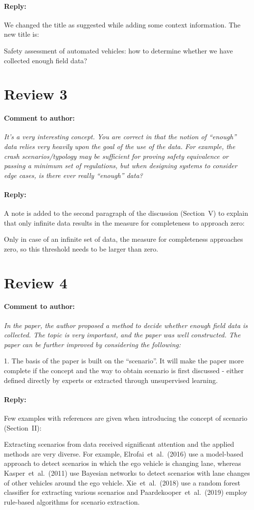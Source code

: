 \documentclass[10pt,final,a4paper,oneside,onecolumn]{article}
\newcommand{\toauthor}{\paragraph*{Comment to author:} \itshape}
\newcommand{\fromauthor}{\paragraph*{Reply:} \normalfont}
\newcommand{\cstart}{\cbstart\color{red}}
\newcommand{\cend}{\cbend\color{black}}
\begin{document}
\fromauthor We changed the title as suggested while adding some context information. The new title is:

\cstart
Safety assessment of automated vehicles: how to determine whether we have collected enough field data?
\cend

\section*{Review 3}

\toauthor It's a very interesting concept. You are correct in that the notion of ``enough'' data relies very heavily upon the goal of the use of the data. For example, the crash scenarios/typology may be sufficient for proving safety equivalence or passing a minimum set of regulations, but when designing systems to consider edge cases, is there ever really ``enough'' data? 

\fromauthor A note is added to the second paragraph of the discussion (Section~V) to explain that only infinite data results in the measure for completeness to approach zero:

\cstart Only in case of an infinite set of data, the measure for completeness approaches zero, so this threshold needs to be larger than zero. \cend

\section*{Review 4}

\toauthor In the paper, the author proposed a method to decide whether enough field data is collected. The topic is very important, and the paper was well constructed. The paper can be further improved by considering the following:

1. The basis of the paper is built on the ``scenario''. It will make the paper more complete if the concept and the way to obtain scenario is first discussed - either defined directly by experts or extracted through unsupervised learning.

\fromauthor Few examples with references are given when introducing the concept of scenario (Section~II):

\cstart 
Extracting scenarios from data received significant attention and the applied methods are very diverse. For example, Elrofai~et~al.\ (2016) use a model-based approach to detect scenarios in which the ego vehicle is changing lane, whereas Kasper~et~al.\ (2011) use Bayesian networks to detect scenarios with lane changes of other vehicles around the ego vehicle. Xie~et~al.\ (2018) use a random forest classifier for extracting various scenarios and Paardekooper~et~al.\ (2019) employ rule-based algorithms for scenario extraction. 
\cend
\end{document}
